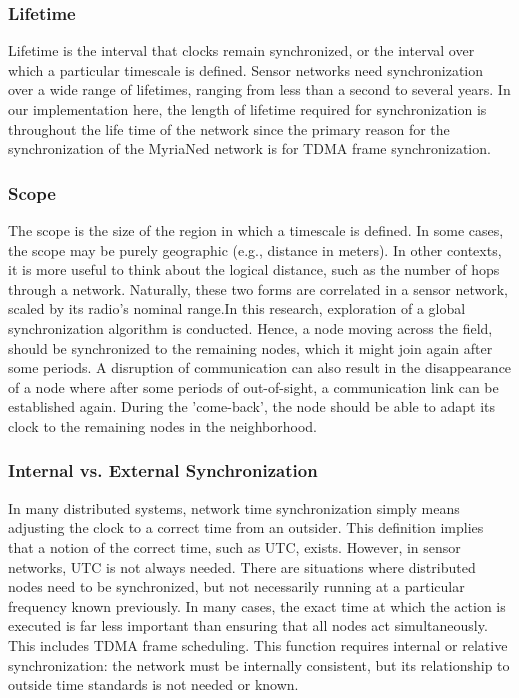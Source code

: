 \documentclass[a4paper,10pt]{report}
\begin{document}
\subsubsection{\textbf{Lifetime}} Lifetime is the interval that clocks remain synchronized, or the interval over which a particular
timescale is defined. Sensor networks need synchronization over a wide range of lifetimes, ranging from less than a second to several
years. In our implementation here, the length of lifetime required for synchronization is throughout the life time of the network since
the primary reason for the synchronization of the MyriaNed network is for TDMA frame synchronization.
\subsubsection{\textbf{Scope}} The scope is the size of the region in which a timescale is defined. In some cases, the scope may be purely
geographic (e.g., distance in meters). In other contexts, it is more useful to think about the logical distance, such as the number of
hops through a network. Naturally, these two forms are correlated in a sensor network, scaled by its radio's nominal range.\newline In
this research, exploration of a global synchronization algorithm is conducted. Hence, a node moving across the field, should be
synchronized to the remaining nodes, which it might join again after some periods. A disruption of communication can also result in the
disappearance of a node where after some periods of out-of-sight, a communication link can be established again. During the 'come-back',
the node should be able to adapt its clock to the remaining nodes in the neighborhood.
\subsubsection{\textbf{Internal vs. External Synchronization}}
In many distributed systems, network time synchronization simply means adjusting the clock to a correct time from an outsider. This
definition implies that a notion of the correct time, such as UTC, exists. However, in sensor networks, UTC is not always needed. There
are situations where distributed nodes need to be synchronized, but not necessarily running at a particular frequency known previously.
In many cases, the exact time at which the action is executed is far less important than ensuring that all nodes act simultaneously. This
includes TDMA frame scheduling. This function requires internal or relative synchronization: the network must be internally consistent,
but its relationship to outside time standards is not needed or known.
\end{document}
